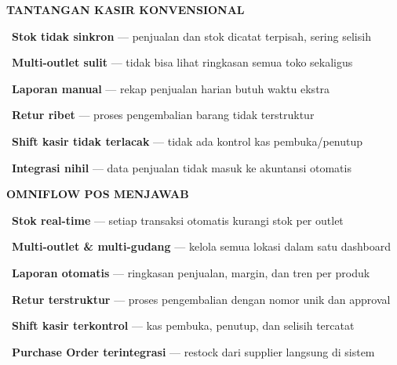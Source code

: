 \documentclass[a4paper]{article}
\begin{document}
\noindent
\begin{minipage}[t]{0.485\textwidth}
    \colorbox{RedLight}{%
        \begin{minipage}{\dimexpr\textwidth-2\fboxsep\relax}
            {\fontsize{10}{13}\selectfont\bfseries\color{RedText} TANTANGAN KASIR KONVENSIONAL}
        \end{minipage}}\par
    \vspace{4pt}

    {\fontsize{9.5}{13}\selectfont\color{TextDark}%
    \textbullet\ \textbf{Stok tidak sinkron} — penjualan dan stok dicatat terpisah, sering selisih\par\vspace{4pt}%
    \textbullet\ \textbf{Multi-outlet sulit} — tidak bisa lihat ringkasan semua toko sekaligus\par\vspace{4pt}%
    \textbullet\ \textbf{Laporan manual} — rekap penjualan harian butuh waktu ekstra\par\vspace{4pt}%
    \textbullet\ \textbf{Retur ribet} — proses pengembalian barang tidak terstruktur\par\vspace{4pt}%
    \textbullet\ \textbf{Shift kasir tidak terlacak} — tidak ada kontrol kas pembuka/penutup\par\vspace{4pt}%
    \textbullet\ \textbf{Integrasi nihil} — data penjualan tidak masuk ke akuntansi otomatis}%
\end{minipage}%
\hfill%
\begin{minipage}[t]{0.485\textwidth}
    \colorbox{AmberPrimary}{%
        \begin{minipage}{\dimexpr\textwidth-2\fboxsep\relax}
            {\fontsize{10}{13}\selectfont\bfseries\color{White} OMNIFLOW POS MENJAWAB}
        \end{minipage}}\par
    \vspace{4pt}

    {\fontsize{9.5}{13}\selectfont\color{TextDark}%
    \textbullet\ \textbf{Stok real-time} — setiap transaksi otomatis kurangi stok per outlet\par\vspace{4pt}%
    \textbullet\ \textbf{Multi-outlet \& multi-gudang} — kelola semua lokasi dalam satu dashboard\par\vspace{4pt}%
    \textbullet\ \textbf{Laporan otomatis} — ringkasan penjualan, margin, dan tren per produk\par\vspace{4pt}%
    \textbullet\ \textbf{Retur terstruktur} — proses pengembalian dengan nomor unik dan approval\par\vspace{4pt}%
    \textbullet\ \textbf{Shift kasir terkontrol} — kas pembuka, penutup, dan selisih tercatat\par\vspace{4pt}%
    \textbullet\ \textbf{Purchase Order terintegrasi} — restock dari supplier langsung di sistem}%
\end{minipage}
\end{document}
